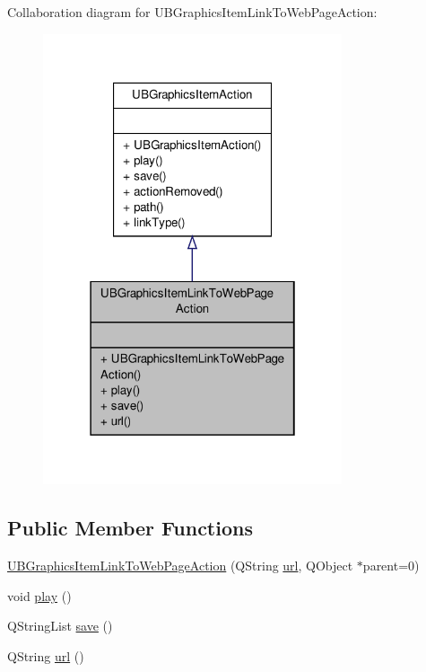 Collaboration diagram for U\-B\-Graphics\-Item\-Link\-To\-Web\-Page\-Action\-:
\nopagebreak
\begin{figure}[H]
\begin{center}
\leavevmode
\includegraphics[width=250pt]{db/d3f/class_u_b_graphics_item_link_to_web_page_action__coll__graph}
\end{center}
\end{figure}
\subsection*{Public Member Functions}
\begin{DoxyCompactItemize}
\item 
\hyperlink{class_u_b_graphics_item_link_to_web_page_action_a78fa62344687a8d40a26ae5b9a41b77d}{U\-B\-Graphics\-Item\-Link\-To\-Web\-Page\-Action} (Q\-String \hyperlink{class_u_b_graphics_item_link_to_web_page_action_a4be1a29d948ff70cfaecb27d188e7825}{url}, Q\-Object $\ast$parent=0)
\item 
void \hyperlink{class_u_b_graphics_item_link_to_web_page_action_a0ac3f916fcfc03ec00653387e3106943}{play} ()
\item 
Q\-String\-List \hyperlink{class_u_b_graphics_item_link_to_web_page_action_afbb2cdd32bb9081e0381e0bdc6f8d0eb}{save} ()
\item 
Q\-String \hyperlink{class_u_b_graphics_item_link_to_web_page_action_a4be1a29d948ff70cfaecb27d188e7825}{url} ()
\end{DoxyCompactItemize}


